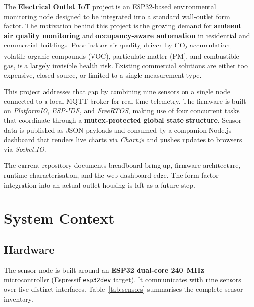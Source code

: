 \documentclass[11pt,a4paper]{article}
\begin{document}
The \textbf{Electrical Outlet IoT} project is an ESP32-based environmental monitoring node designed to
be integrated into a standard wall-outlet form factor. The motivation behind this project is the growing
demand for \textbf{ambient air quality monitoring} and \textbf{occupancy-aware automation} in residential
and commercial buildings. Poor indoor air quality, driven by CO\textsubscript{2} accumulation,
volatile organic compounds (VOC), particulate matter (PM), and combustible gas, is a largely invisible
health risk. Existing commercial solutions are either too expensive, closed-source, or limited to a single
measurement type.

\vspace{5pt}

This project addresses that gap by combining nine sensors on a single node,
connected to a local MQTT broker for real-time telemetry. The firmware is built on \textit{PlatformIO},
\textit{ESP-IDF}, and \textit{FreeRTOS}, making use of four concurrent tasks that coordinate through
a \textbf{mutex-protected global state structure}. Sensor data is published as JSON payloads
and consumed by a companion Node.js dashboard that renders live charts via \textit{Chart.js}
and pushes updates to browsers via \textit{Socket.IO}.

\vspace{5pt}

The current repository documents breadboard bring-up, firmware architecture, runtime
characterisation, and the web-dashboard edge. The form-factor integration into an actual outlet housing
is left as a future step.

\section{System Context}
\subsection{Hardware}
\vspace{5pt}

The sensor node is built around an \textbf{ESP32 dual-core 240~MHz} microcontroller (Espressif
\texttt{esp32dev} target). It communicates with nine sensors over five distinct interfaces.
Table~\ref{tab:sensors} summarises the complete sensor inventory.
\end{document}
